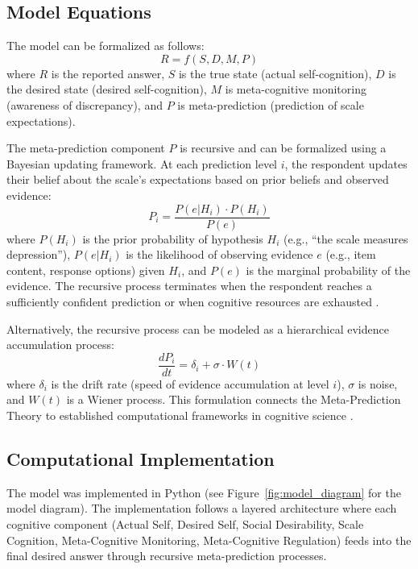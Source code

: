 \documentclass[10pt,twocolumn]{article}
\begin{document}
\subsection{Model Equations}

The model can be formalized as follows:
\begin{equation}
R = f(S, D, M, P)
\end{equation}
where $R$ is the reported answer, $S$ is the true state (actual self-cognition), $D$ is the desired state (desired self-cognition), $M$ is meta-cognitive monitoring (awareness of discrepancy), and $P$ is meta-prediction (prediction of scale expectations).

The meta-prediction component $P$ is recursive and can be formalized using a Bayesian updating framework. At each prediction level $i$, the respondent updates their belief about the scale's expectations based on prior beliefs and observed evidence:
\begin{equation}
P_i = \frac{P(e|H_i) \cdot P(H_i)}{P(e)}
\end{equation}
where $P(H_i)$ is the prior probability of hypothesis $H_i$ (e.g., ``the scale measures depression''), $P(e|H_i)$ is the likelihood of observing evidence $e$ (e.g., item content, response options) given $H_i$, and $P(e)$ is the marginal probability of the evidence. The recursive process terminates when the respondent reaches a sufficiently confident prediction or when cognitive resources are exhausted \citep{Ratcliff1978}.

Alternatively, the recursive process can be modeled as a hierarchical evidence accumulation process:
\begin{equation}
\frac{dP_i}{dt} = \delta_i + \sigma \cdot W(t)
\end{equation}
where $\delta_i$ is the drift rate (speed of evidence accumulation at level $i$), $\sigma$ is noise, and $W(t)$ is a Wiener process. This formulation connects the Meta-Prediction Theory to established computational frameworks in cognitive science \citep{Ratcliff2008, Vandekerckhove2007}.

\subsection{Computational Implementation}

The model was implemented in Python (see Figure~\ref{fig:model_diagram} for the model diagram). The implementation follows a layered architecture where each cognitive component (Actual Self, Desired Self, Social Desirability, Scale Cognition, Meta-Cognitive Monitoring, Meta-Cognitive Regulation) feeds into the final desired answer through recursive meta-prediction processes.
\end{document}
